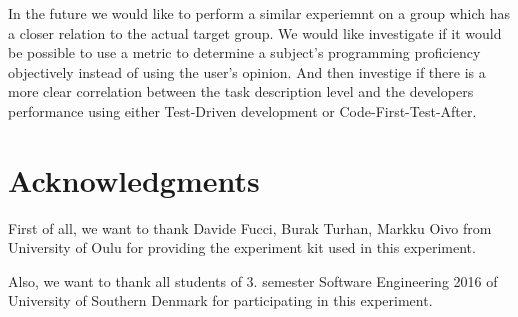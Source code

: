 \documentclass{sig-alternate-05-2015}
\begin{document}
In the future we would like to perform a similar experiemnt on a group which has a closer relation to the actual target group. We would like investigate if it would be possible to use a metric to determine a subject's programming proficiency objectively instead of using the user's opinion. And then investige if there is a more clear correlation between the task description level and the developers performance using either Test-Driven development or Code-First-Test-After.




\section{Acknowledgments}

First of all, we want to thank Davide Fucci, Burak Turhan, Markku Oivo from University of Oulu for providing the experiment kit used in this experiment.

Also, we want to thank all students of 3. semester Software Engineering 2016 of University of Southern Denmark for participating in this experiment.
\end{document}
